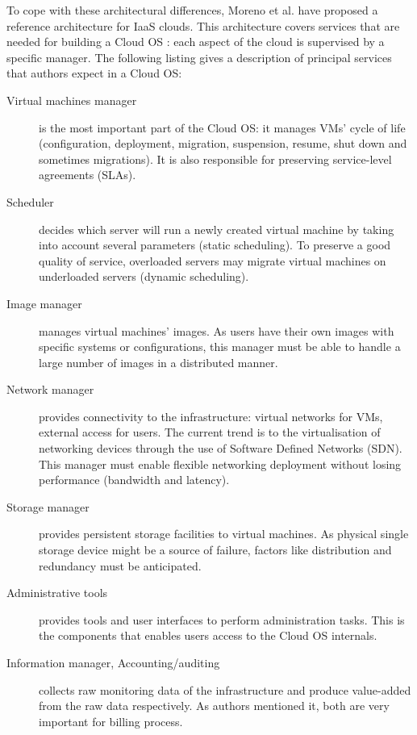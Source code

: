 To cope with these architectural differences, Moreno et al. have proposed a 
reference architecture \cite{moreno2012iaas} for IaaS clouds. This architecture 
covers services that are needed for building a Cloud OS : each aspect of the 
cloud is supervised by a specific manager. The following listing gives a 
description of principal services that authors expect in a Cloud OS:
\begin{description}
	
	\item [Virtual machines manager] is the most important part of the Cloud OS:
	it manages VMs' cycle of life (configuration, deployment, 
	migration, suspension, resume, shut down and sometimes migrations). It is 
	also responsible for preserving service-level agreements (SLAs).

	\item [Scheduler] decides which server will run a newly created virtual 
	machine by taking into account several parameters (static scheduling). To 
	preserve a good quality of service, overloaded servers may migrate virtual
	machines on underloaded servers (dynamic scheduling).

	\item [Image manager] manages virtual machines' images. As users have their
	own images with specific systems or configurations, this manager must be 
	able to handle a large number of images in a distributed manner.

	\item [Network manager] provides connectivity to the infrastructure: virtual
	networks for VMs, external access for users. The current trend is to the
	virtualisation of networking devices through the use of Software
	Defined Networks (SDN). This manager must enable flexible networking 
	deployment without losing performance (bandwidth and latency).

	\item [Storage manager] provides persistent storage facilities to virtual 
	machines. As physical single storage device might be a source of failure,
	factors like distribution and redundancy must be anticipated.

	\item [Administrative tools] provides tools and user interfaces to perform
	administration tasks. This is the components that enables users access to
	the Cloud OS internals.

	\item [Information manager, Accounting/auditing ] collects raw monitoring 
	data of the infrastructure and produce value-added from the raw data 
	respectively. As authors mentioned it, both are very important for billing
	process.

\end{description}

